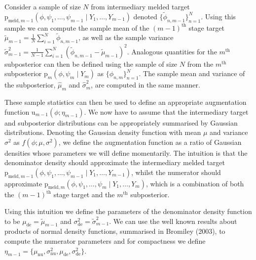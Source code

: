 \documentclass[10pt,a4paper,]{article}
\newcommand{\pd}{\text{p}}
\newcommand{\tarw}{\text{u}}
\newcommand{\Nx}{N}
\newcommand{\sampleindex}{n}
\newcommand{\modelindex}{m}
\begin{document}
Consider a sample of size \(\Nx\) from intermediary melded target
\(\pd_{\text{meld}, \modelindex - 1}(\phi, \psi_{1}, \ldots, \psi_{\modelindex - 1} \mid Y_{1}, \ldots, Y_{\modelindex - 1})\)
denoted
\(\{\tilde{\phi}_{\sampleindex, \modelindex - 1}\}_{\sampleindex = 1}^{\Nx}\).
Using this sample we can compute the sample mean of the
\((\modelindex - 1)^{\text{th}}\) stage target
\(\tilde{\mu}_{\modelindex - 1} = \frac{1}{\Nx}\sum\limits_{i = 1}^{\Nx}\tilde{\phi}_{\sampleindex, \modelindex - 1}\),
as well as the sample variance
\(\tilde{\sigma}^{2}_{\modelindex - 1} = \frac{1}{\Nx - 1}\sum\limits_{i = 1}^{\Nx} (\tilde{\phi}_{\sampleindex, \modelindex - 1} - \tilde{\mu}_{\modelindex - 1})^{2}\).
Analogous quantities for the \(\modelindex^{\text{th}}\) subposterior
can then be defined using the sample of size \(\Nx\) from the
\(\modelindex^{\text{th}}\) subposterior
\(\pd_{\modelindex}(\phi, \psi_{\modelindex} \mid Y_{\modelindex})\) as
\(\{\phi_{\sampleindex, \modelindex}\}_{\sampleindex = 1}^{\Nx}\). The
sample mean and variance of the subposterior,
\(\hat{\mu}_{\modelindex}\) and \(\hat{\sigma}^{2}_{\modelindex}\), are
computed in the same manner.

These sample statistics can then be used to define an appropriate
augmentation function
\(\tarw_{\modelindex - 1}(\phi; \eta_{\modelindex - 1})\). We now have
to assume that the intermediary target and subposterior distributions
can be appropriately summarised by Gaussian distributions. Denoting the
Gaussian density function with mean \(\mu\) and variance \(\sigma^2\) as
\(f(\phi; \mu, \sigma^2)\), we define the augmentation function as a
ratio of Gaussian densities
 whose
parameters we will define momentarily. The intuition is that the
denominator density should approximate the intermediary melded target
\(\pd_{\text{meld}, \modelindex - 1}(\phi, \psi_{1}, \ldots, \psi_{\modelindex - 1} \mid Y_{1}, \ldots, Y_{\modelindex - 1})\),
whilst the numerator should approximate
\(\pd_{\text{meld}, \modelindex}(\phi, \psi_{1}, \ldots, \psi_{\modelindex} \mid Y_{1}, \ldots, Y_{\modelindex})\),
which is a combination of both the \((\modelindex - 1)^{\text{th}}\)
stage target and the \(\modelindex^{\text{th}}\) subposterior.

Using this intuition we define the parameters of the denominator density
function to be \(\mu_{\text{de}} = \tilde{\mu}_{\modelindex - 1}\) and
\(\sigma^{2}_{\text{de}} = \tilde{\sigma}^{2}_{\modelindex - 1}\). We
can use the well known results about products of normal density
functions, summarised in Bromiley (2003), to compute the numerator
parameters  and for
compactness we define
\(\eta_{\modelindex - 1} = \{\mu_{\text{nu}}, \sigma^{2}_{\text{nu}}, \mu_{\text{de}}, \sigma^{2}_{\text{de}}\}\).
\end{document}

